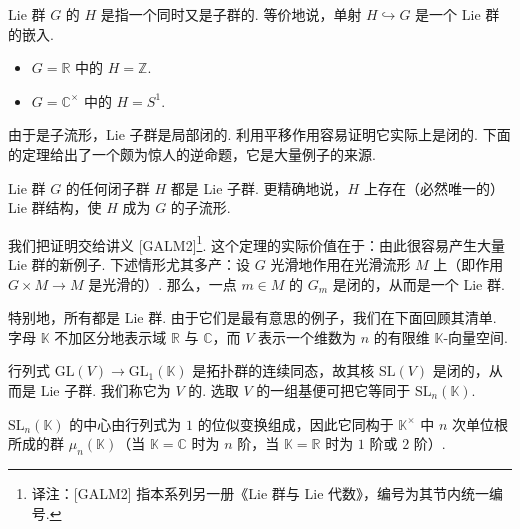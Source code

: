 \begin{definition}\label{def:ssl-1-2-6}
Lie 群 $G$ 的 $H$ 是指一个同时又是子群的. 等价地说，单射 $H\hookrightarrow G$ 是一个 Lie 群的嵌入.
\end{definition}

\begin{example*}
\begin{itemize}
\item $G=\mathbb{R}$ 中的 $H=\mathbb{Z}$.
\item $G=\mathbb{C}^{\times}$ 中的 $H=S^{1}$.
\end{itemize}
\end{example*}

由于是子流形，Lie 子群是局部闭的. 利用平移作用容易证明它实际上是闭的. 下面的定理给出了一个颇为惊人的逆命题，它是大量例子的来源.

\begin{theorem}\label{thm:ssl-1-2-7}
Lie 群 $G$ 的任何闭子群 $H$ 都是 Lie 子群. 更精确地说，$H$ 上存在（必然唯一的）Lie 群结构，使 $H$ 成为 $G$ 的子流形.
\end{theorem}

我们把证明交给讲义 [GALM2]\footnote{译注：[GALM2] 指本系列另一册《Lie 群与 Lie 代数》，编号为其节内统一编号.}. 这个定理的实际价值在于：由此很容易产生大量 Lie 群的新例子. 下述情形尤其多产：设 $G$ 光滑地作用在光滑流形 $M$ 上（即作用 $G\times M\longrightarrow M$ 是光滑的）. 那么，一点 $m\in M$ 的 $G_m$ 是闭的，从而是一个 Lie 群.

特别地，所有都是 Lie 群. 由于它们是最有意思的例子，我们在下面回顾其清单. 字母 $\mathbb{K}$ 不加区分地表示域 $\mathbb{R}$ 与 $\mathbb{C}$，而 $V$ 表示一个维数为 $n$ 的有限维 $\mathbb{K}$-向量空间.

\begin{numpara}[特殊线性群]\label{np:ssl-1-2-8}
行列式 $\mathrm{GL}(V)\longrightarrow\mathrm{GL}_1(\mathbb{K})$ 是拓扑群的连续同态，故其核 $\mathrm{SL}(V)$ 是闭的，从而是 Lie 子群. 我们称它为 $V$ 的. 选取 $V$ 的一组基便可把它等同于 $\mathrm{SL}_n(\mathbb{K})$.
\end{numpara}

\begin{exercise*}
$\mathrm{SL}_n(\mathbb{K})$ 的中心由行列式为 $1$ 的位似变换组成，因此它同构于 $\mathbb{K}^{\times}$ 中 $n$ 次单位根所成的群 $\mu_n(\mathbb{K})$（当 $\mathbb{K}=\mathbb{C}$ 时为 $n$ 阶，当 $\mathbb{K}=\mathbb{R}$ 时为 $1$ 阶或 $2$ 阶）.
\end{exercise*}

